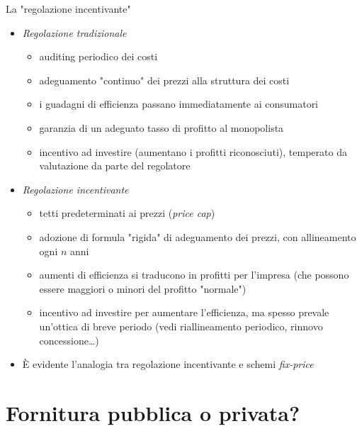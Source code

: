 \documentclass[aspectratio=149,11pt]{beamer}
\begin{document}
\begin{frame}{La "regolazione incentivante"}
\begin{itemize}
\item \emph{Regolazione tradizionale}
\begin{itemize}
\item auditing periodico dei costi
\item adeguamento "continuo" dei prezzi alla struttura dei costi
\item i guadagni di efficienza passano immediatamente ai consumatori
\item garanzia di un adeguato tasso di profitto al monopolista
\item incentivo ad investire (aumentano i profitti riconosciuti), temperato da
valutazione da parte del regolatore
\end{itemize}
\item \emph{Regolazione incentivante}
\begin{itemize}
\item tetti predeterminati ai prezzi (\emph{price cap})
\item adozione di formula "rigida" di adeguamento dei prezzi, con allineamento
ogni $n$ anni
\item aumenti di efficienza si traducono in profitti per l'impresa (che possono
essere maggiori o minori del profitto "normale")
\item incentivo ad investire per aumentare l'efficienza, ma spesso prevale
un'ottica di breve periodo (vedi riallineamento periodico, rinnovo
concessione\ldots{})
\end{itemize}
\item È evidente l'analogia tra regolazione incentivante e schemi \emph{fix-price}
\end{itemize}
\end{frame}

\section{Fornitura pubblica o privata?}
\end{document}
